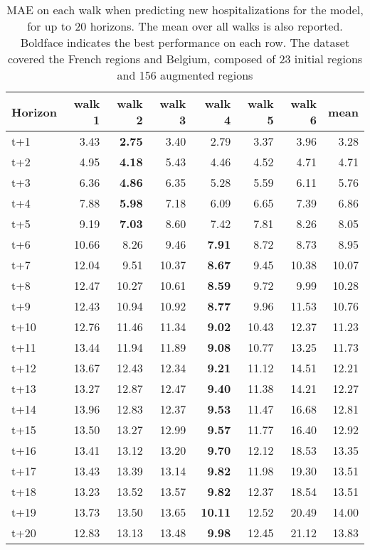 \begin{table}[H]
\centering
\caption{MAE on each walk when predicting new hospitalizations for the model, for up to 20 horizons. The mean over all walks is also reported. Boldface indicates the best performance on each row. The dataset covered the French regions and Belgium, composed of 23 initial regions and 156 augmented regions }
\label{tab:MAE_walk_dense_model}
\begin{tabular}{lrrrrrrr}
\toprule
Horizon &  walk 1 &  walk 2 &  walk 3 &  walk 4 &  walk 5 &  walk 6 &  mean \\
\midrule
t+1  & 3.43  & \textbf{2.75}  & 3.40  & 2.79  & 3.37  & 3.96  & 3.28  \\
t+2  & 4.95  & \textbf{4.18}  & 5.43  & 4.46  & 4.52  & 4.71  & 4.71  \\
t+3  & 6.36  & \textbf{4.86}  & 6.35  & 5.28  & 5.59  & 6.11  & 5.76  \\
t+4  & 7.88  & \textbf{5.98}  & 7.18  & 6.09  & 6.65  & 7.39  & 6.86  \\
t+5  & 9.19  & \textbf{7.03}  & 8.60  & 7.42  & 7.81  & 8.26  & 8.05  \\
t+6  & 10.66  & 8.26  & 9.46  & \textbf{7.91}  & 8.72  & 8.73  & 8.95  \\
t+7  & 12.04  & 9.51  & 10.37  & \textbf{8.67}  & 9.45  & 10.38  & 10.07  \\
t+8  & 12.47  & 10.27  & 10.61  & \textbf{8.59}  & 9.72  & 9.99  & 10.28  \\
t+9  & 12.43  & 10.94  & 10.92  & \textbf{8.77}  & 9.96  & 11.53  & 10.76  \\
t+10  & 12.76  & 11.46  & 11.34  & \textbf{9.02}  & 10.43  & 12.37  & 11.23  \\
t+11  & 13.44  & 11.94  & 11.89  & \textbf{9.08}  & 10.77  & 13.25  & 11.73  \\
t+12  & 13.67  & 12.43  & 12.34  & \textbf{9.21}  & 11.12  & 14.51  & 12.21  \\
t+13  & 13.27  & 12.87  & 12.47  & \textbf{9.40}  & 11.38  & 14.21  & 12.27  \\
t+14  & 13.96  & 12.83  & 12.37  & \textbf{9.53}  & 11.47  & 16.68  & 12.81  \\
t+15  & 13.50  & 13.27  & 12.99  & \textbf{9.57}  & 11.77  & 16.40  & 12.92  \\
t+16  & 13.41  & 13.12  & 13.20  & \textbf{9.70}  & 12.12  & 18.53  & 13.35  \\
t+17  & 13.43  & 13.39  & 13.14  & \textbf{9.82}  & 11.98  & 19.30  & 13.51  \\
t+18  & 13.23  & 13.52  & 13.57  & \textbf{9.82}  & 12.37  & 18.54  & 13.51  \\
t+19  & 13.73  & 13.50  & 13.65  & \textbf{10.11}  & 12.52  & 20.49  & 14.00  \\
t+20  & 12.83  & 13.13  & 13.48  & \textbf{9.98}  & 12.45  & 21.12  & 13.83  \\

\bottomrule
\end{tabular}
\end{table}
